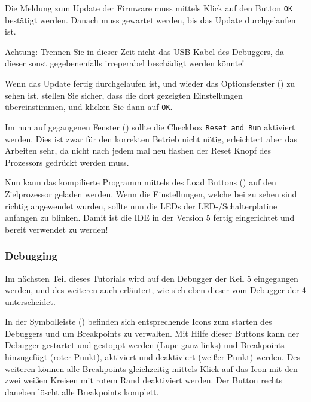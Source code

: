 Die Meldung zum Update der Firmware muss mittels Klick auf den Button \texttt{OK} bestätigt werden. Danach muss gewartet werden, bis das Update durchgelaufen ist.

\begin{warning}
  Achtung: Trennen Sie in dieser Zeit nicht das USB Kabel des Debuggers, da dieser sonst gegebenenfalls irreperabel beschädigt werden könnte!
\end{warning}

Wenn das Update fertig durchgelaufen ist, und wieder das Optionsfenster () zu sehen ist, stellen Sie sicher, dass die dort gezeigten Einstellungen übereinstimmen, und klicken Sie dann auf \texttt{OK}.


Im nun auf gegangenen Fenster () sollte die Checkbox \texttt{Reset and Run} aktiviert werden. Dies ist zwar für den korrekten Betrieb nicht nötig, erleichtert aber das Arbeiten sehr, da nicht nach jedem mal neu flashen der Reset Knopf des Prozessors gedrückt werden muss.


Nun kann das kompilierte Programm mittels des Load Buttons () auf den Zielprozessor geladen werden. Wenn die Einstellungen, welche bei  zu sehen sind richtig angewendet wurden, sollte nun die LEDs der LED-/Schalterplatine anfangen zu blinken. Damit ist die \uVision{} \gls{IDE} in der Version 5 fertig eingerichtet und bereit verwendet zu werden!

\subsubsection{Debugging}
\label{sec:tut-debugging}
Im nächsten Teil dieses Tutorials wird auf den Debugger der \gls{Keil} \uVision{} 5 eingegangen werden, und des weiteren auch erläutert, wie sich eben dieser vom Debugger der \uVision{} 4 unterscheidet.

In der Symbolleiste () befinden sich entsprechende Icons zum starten des Debuggers und um Breakpoints zu verwalten. Mit Hilfe dieser Buttons kann der Debugger gestartet und gestoppt werden (Lupe ganz links) und Breakpoints hinzugefügt (roter Punkt), aktiviert und deaktiviert (weißer Punkt) werden. Des weiteren können alle Breakpoints gleichzeitig mittels Klick auf das Icon mit den zwei weißen Kreisen mit rotem Rand deaktiviert werden. Der Button rechts daneben löscht alle Breakpoints komplett.

